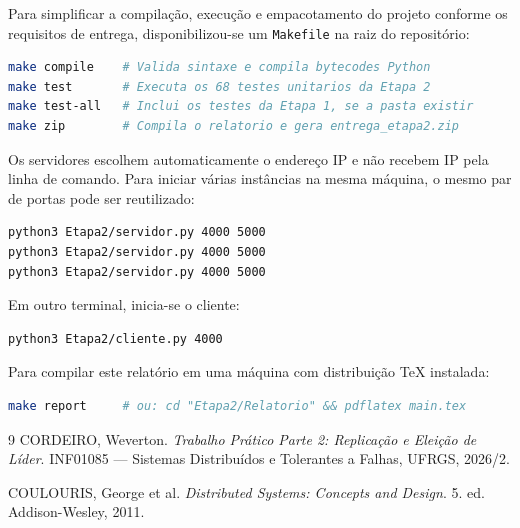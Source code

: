 \documentclass[12pt,a4paper]{article}
\newcommand{\arquivo}[1]{\texttt{#1}}
\begin{document}
Para simplificar a compilação, execução e empacotamento do projeto conforme os requisitos de entrega, disponibilizou-se um \arquivo{Makefile} na raiz do repositório:

\begin{lstlisting}[style=pythonstyle,language=bash,numbers=none]
make compile    # Valida sintaxe e compila bytecodes Python
make test       # Executa os 68 testes unitarios da Etapa 2
make test-all   # Inclui os testes da Etapa 1, se a pasta existir
make zip        # Compila o relatorio e gera entrega_etapa2.zip
\end{lstlisting}

Os servidores escolhem automaticamente o endereço IP e não recebem IP pela linha de comando. Para iniciar várias instâncias na mesma máquina, o mesmo par de portas pode ser reutilizado:

\begin{lstlisting}[style=pythonstyle,language=bash,numbers=none]
python3 Etapa2/servidor.py 4000 5000
python3 Etapa2/servidor.py 4000 5000
python3 Etapa2/servidor.py 4000 5000
\end{lstlisting}

Em outro terminal, inicia-se o cliente:

\begin{lstlisting}[style=pythonstyle,language=bash,numbers=none]
python3 Etapa2/cliente.py 4000
\end{lstlisting}

Para compilar este relatório em uma máquina com distribuição TeX instalada:

\begin{lstlisting}[style=pythonstyle,language=bash,numbers=none]
make report     # ou: cd "Etapa2/Relatorio" && pdflatex main.tex
\end{lstlisting}

\begin{thebibliography}{9}
    CORDEIRO, Weverton. \textit{Trabalho Prático Parte 2: Replicação e Eleição de Líder}. INF01085 --- Sistemas Distribuídos e Tolerantes a Falhas, UFRGS, 2026/2.

    COULOURIS, George et al. \textit{Distributed Systems: Concepts and Design}. 5. ed. Addison-Wesley, 2011.
\end{thebibliography}
\end{document}
